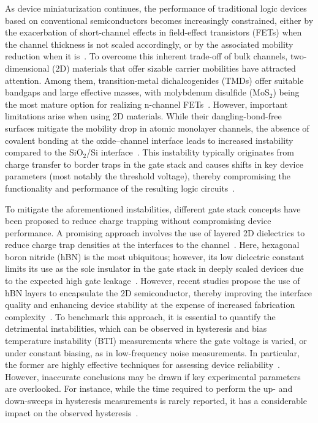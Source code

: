 \documentclass[conference]{IEEEtran}
\begin{document}
As device miniaturization continues, the performance of traditional logic devices based on conventional semiconductors becomes increasingly constrained, either by the exacerbation of short-channel effects in field-effect transistors (FETs) when the channel thickness is not scaled accordingly, or by the associated mobility reduction when it is~\cite{liu_promises_2021}. To overcome this inherent trade-off of bulk channels, two-dimensional (2D) materials that offer sizable carrier mobilities have attracted attention. Among them, transition-metal dichalcogenides (TMDs) offer suitable bandgaps and large effective masses, with molybdenum disulfide (MoS$_2$) being the most mature option for realizing n-channel FETs~\cite{das_transistors_2021}. 
However, important limitations arise when using 2D materials. While their dangling-bond-free surfaces mitigate the mobility drop in atomic monolayer channels, the absence of covalent bonding at the oxide–channel interface leads to increased instability compared to the SiO$_2$/Si interface~\cite{lan_reliability_2025}. This instability typically originates from charge transfer to border traps in the gate stack and causes shifts in key device parameters (most notably the threshold voltage), thereby compromising the functionality and performance of the resulting logic circuits~\cite{mulong_luo_impacts_2015}.

To mitigate the aforementioned instabilities, different gate stack concepts have been proposed to reduce charge trapping without compromising device performance. A promising approach involves the use of layered 2D dielectrics to reduce charge trap densities at the interfaces to the channel~\cite{Cui2015}. Here, hexagonal boron nitride (hBN) is the most ubiquitous; however, its low dielectric constant limits its use as the sole insulator in the gate stack in deeply scaled devices due to the expected high gate leakage~\cite{knobloch_performance_2021}. However, recent studies propose the use of hBN layers to encapsulate the 2D semiconductor, thereby improving the interface quality and enhancing device stability at the expense of increased fabrication complexity~\cite{piacentini_stable_2022}.
To benchmark this approach, it is essential to quantify the detrimental instabilities, which can be observed in hysteresis and bias temperature instability (BTI) measurements where the gate voltage is varied, or under constant biasing, as in low-frequency noise measurements. In particular, the former are highly effective techniques for assessing device reliability~\cite{provias_reliability_2023}. However, inaccurate conclusions may be drawn if key experimental parameters are overlooked. For instance, while the time required to perform the up- and down-sweeps in hysteresis measurements is rarely reported, it has a considerable impact on the observed hysteresis~\cite{karl_standardized_2025}. %
\end{document}
